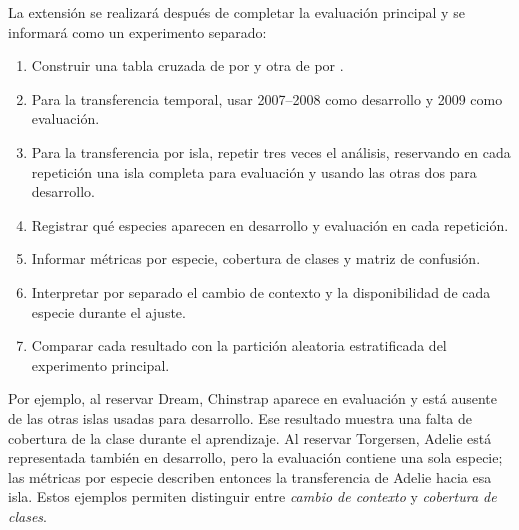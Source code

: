 \documentclass[11pt,a4paper]{article}
\newcommand{\cod}[1]{\texttt{\detokenize{#1}}}
\begin{document}
La extensión se realizará después de completar la evaluación principal y se informará como un experimento separado:

\begin{enumerate}
  \item Construir una tabla cruzada de \cod{island} por \cod{species} y otra de \cod{year} por \cod{species}.
  \item Para la transferencia temporal, usar 2007--2008 como desarrollo y 2009 como evaluación.
  \item Para la transferencia por isla, repetir tres veces el análisis, reservando en cada repetición una isla completa para evaluación y usando las otras dos para desarrollo.
  \item Registrar qué especies aparecen en desarrollo y evaluación en cada repetición.
  \item Informar métricas por especie, cobertura de clases y matriz de confusión.
  \item Interpretar por separado el cambio de contexto y la disponibilidad de cada especie durante el ajuste.
  \item Comparar cada resultado con la partición aleatoria estratificada del experimento principal.
\end{enumerate}

Por ejemplo, al reservar Dream, Chinstrap aparece en evaluación y está ausente de las otras islas usadas para desarrollo. Ese resultado muestra una falta de cobertura de la clase durante el aprendizaje. Al reservar Torgersen, Adelie está representada también en desarrollo, pero la evaluación contiene una sola especie; las métricas por especie describen entonces la transferencia de Adelie hacia esa isla. Estos ejemplos permiten distinguir entre \emph{cambio de contexto} y \emph{cobertura de clases}.
\end{document}
